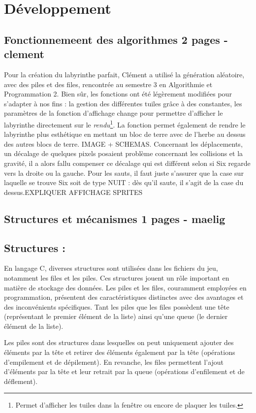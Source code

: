 \documentclass[10pt]{article}
\begin{document}
\section{Développement}
   \subsection{Fonctionnemeent des algorithmes 2 pages - clement}
   Pour la création du labyrinthe parfait, Clément a utilisé la génération aléatoire, avec des piles et des files, rencontrée au semestre 3 en Algorithmie et Programmation 2.
   Bien sûr, les fonctions ont été légèrement modifiées pour s'adapter à nos fins : la gestion des différentes tuiles grâce à des constantes, les 
   paramètres de la fonction d'affichage change pour permettre d'afficher le labyrinthe directement sur le \textit{rendu}\footnote{
   Permet d'afficher les tuiles dans la fenêtre ou encore de plaquer les tuiles.}. La fonction permet également de rendre le labyrinthe plus esthétique
   en mettant un bloc de terre avec de l'herbe au dessus des autres blocs de terre. IMAGE + SCHEMAS. Concernant les déplacements, un décalage de quelques
   pixels posaient problème concernant les collisions et la gravité, il a alors fallu compenser ce décalage qui est différent selon si Six regarde vers
   la droite ou la gauche. Pour les sauts, il faut juste s'assurer que la case sur laquelle se trouve Six soit de type NUIT : dès qu'il saute, il s'agit
   de la case du dessus.EXPLIQUER AFFICHAGE SPRITES
   \subsection{Structures et mécanismes 1 pages - maelig}
   \subsection{Structures :}

   En langage C, diverses structures sont utilisées dans les fichiers du jeu, notamment les files et les piles. 
   Ces structures jouent un rôle important en matière de stockage des données. Les piles et les files, couramment employées en programmation, 
   présentent des caractéristiques distinctes avec des avantages et des inconvénients spécifiques. Tant les piles que les files possèdent une tête 
   (représentant le premier élément de la liste) ainsi qu'une queue (le dernier élément de la liste).

   Les piles sont des structures dans lesquelles on peut uniquement ajouter des éléments par la tête et retirer des éléments également par la tête 
   (opérations d'empilement et de dépilement). En revanche, les files permettent l'ajout d'éléments par la tête et leur retrait par la queue 
   (opérations d'enfilement et de déflement).\\
\end{document}

